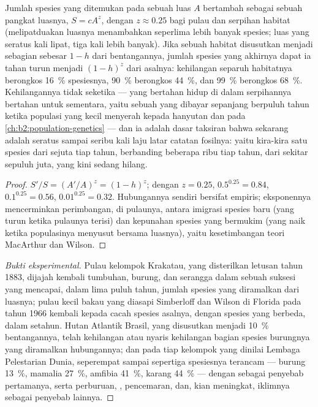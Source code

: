 \begin{theorem}\label{thm:b2:global-change:sar}
%
Jumlah spesies yang ditemukan pada sebuah luas $A$ bertambah sebagai
sebuah pangkat luasnya, $S = cA^{z}$, dengan $z \approx 0.25$ bagi
pulau dan serpihan habitat (melipatduakan luasnya menambahkan seperlima
lebih banyak spesies; luas yang seratus kali lipat, tiga kali lebih
banyak). Jika sebuah habitat disusutkan menjadi sebagian sebesar $1 - h$ dari bentangannya, jumlah spesies yang akhirnya dapat ia tahan turun
menjadi $(1 - h)^{z}$ dari asalnya: kehilangan separuh habitatnya
berongkos \qty{16}{\%} spesiesnya, \qty{90}{\%} berongkos
\qty{44}{\%}, dan \qty{99}{\%} berongkos \qty{68}{\%}. Kehilangannya
tidak seketika --- yang bertahan hidup di dalam serpihannya bertahan
untuk sementara, yaitu sebuah \emph{} yang dibayar
sepanjang berpuluh tahun ketika populasi yang kecil menyerah kepada
hanyutan dan  pada \cref{ch:b2:population-genetics} --- dan
ia adalah dasar taksiran bahwa  sekarang adalah seratus
sampai seribu kali laju latar catatan fosilnya: yaitu kira-kira satu
spesies dari sejuta tiap tahun, berbanding beberapa ribu tiap tahun,
dari sekitar sepuluh juta, yang kini sedang hilang.
\end{theorem}
\begin{proof}
$S'/S = (A'/A)^{z} = (1 - h)^{z}$; dengan $z = 0.25$, $0.5^{0.25} =
0.84$, $0.1^{0.25} = 0.56$, $0.01^{0.25} = 0.32$. Hubungannya sendiri
bersifat empiris; eksponennya mencerminkan perimbangan, di pulaunya,
antara imigrasi spesies baru (yang turun ketika pulaunya terisi) dan
kepunahan spesies yang bermukim (yang naik ketika populasinya menyusut
bersama luasnya), yaitu kesetimbangan teori MacArthur dan Wilson.
\end{proof}
\begin{proof}[Bukti eksperimental]
Pulau kelompok Krakatau, yang disterilkan letusan tahun 1883, dijajah
kembali tumbuhan, burung, dan serangga dalam sebuah suksesi yang
mencapai, dalam lima puluh tahun, jumlah spesies yang diramalkan dari
luasnya; pulau kecil bakau yang diasapi Simberloff dan Wilson di
Florida pada tahun 1966 kembali kepada cacah spesies asalnya, dengan
spesies yang berbeda, dalam setahun. Hutan Atlantik Brasil, yang
disusutkan menjadi \qty{10}{\%} bentangannya, telah kehilangan atau
nyaris kehilangan bagian spesies burungnya yang diramalkan
hubungannya; dan pada tiap kelompok yang dinilai Lembaga Pelestarian
Dunia, seperempat sampai sepertiga spesiesnya terancam --- burung
\qty{13}{\%}, mamalia \qty{27}{\%}, amfibia \qty{41}{\%}, karang
\qty{44}{\%} --- dengan  sebagai penyebab pertamanya,
serta perburuan, , pencemaran, dan, kian meningkat,
iklimnya sebagai penyebab lainnya.
\end{proof}

